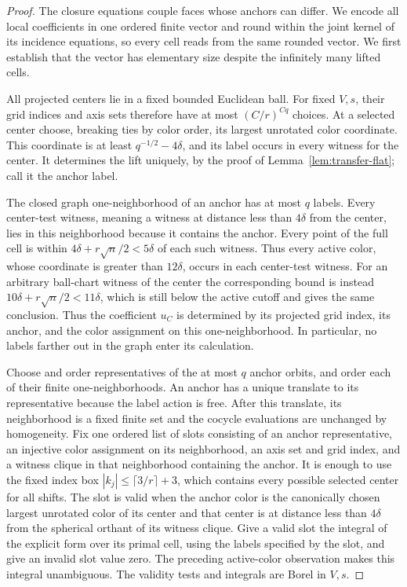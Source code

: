 \begin{proof}
The closure equations couple faces whose anchors can differ.  We encode
all local coefficients in one ordered finite vector and round within the
joint kernel of its incidence equations, so every cell reads from the
same rounded vector.  We first establish that the vector has elementary
size despite the infinitely many lifted cells.

All projected centers lie
in a fixed bounded Euclidean ball.  For fixed \(V,s\), their grid
indices and axis sets therefore have at most \((C/r)^{Cq}\) choices.
At a selected center choose, breaking ties by color order, its largest
unrotated color coordinate.  This coordinate is at least
\(q^{-1/2}-4\delta\), and its label occurs in every witness for the
center.  It determines the lift uniquely, by the proof of
Lemma~\ref{lem:transfer-flat}; call it the anchor label.

The closed graph one-neighborhood of an anchor has at most \(q\)
labels.  Every center-test witness, meaning a witness at distance less
than \(4\delta\) from the center, lies in this neighborhood because it
contains the anchor.  Every point of the full cell is within
\(4\delta+r\sqrt n/2<5\delta\) of each such witness.  Thus every
active color, whose coordinate is greater than \(12\delta\), occurs
in each center-test witness.  For an arbitrary ball-chart witness of
the center the corresponding bound is instead
\(10\delta+r\sqrt n/2<11\delta\), which is still below the active
cutoff and gives the same conclusion.  Thus the
coefficient \(u_C\) is determined by its projected grid index, its
anchor, and the color assignment on this one-neighborhood.  In
particular, no labels farther out in the graph enter its calculation.

Choose and order representatives of the at most \(q\) anchor orbits,
and order each of their finite one-neighborhoods.  An anchor has a
unique translate to its representative because the label action is
free.  After this translate, its neighborhood is a fixed finite set
and the cocycle evaluations are unchanged by homogeneity.  Fix one
ordered list of slots consisting of an anchor representative, an
injective color assignment on its neighborhood, an axis set and grid
index, and a witness clique in that neighborhood containing the anchor.
It is enough to use the fixed index box
\(|k_j|\leq\lceil3/r\rceil+3\), which contains every possible selected
center for all shifts.  The slot is valid when the anchor color is the
canonically chosen largest unrotated color of its center and that center
is at distance less than \(4\delta\) from the spherical orthant of its
witness clique.  Give a valid slot the integral of the explicit form
over its primal cell, using the labels specified by the slot, and give
an invalid slot value zero.  The preceding active-color observation
makes this integral unambiguous.  The validity tests and integrals are
Borel in \(V,s\).


\end{proof}
